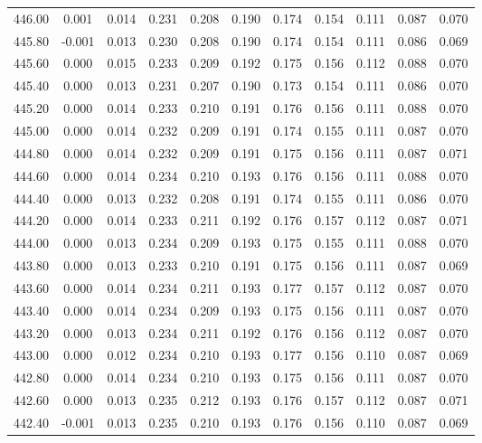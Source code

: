 \begin{longtable}{cccccccccc}
    446.00 &  0.001 &  0.014 &  0.231 &  0.208 &  0.190 &  0.174 &  0.154 &  0.111 &  0.087 &  0.070 \\
    445.80 & -0.001 &  0.013 &  0.230 &  0.208 &  0.190 &  0.174 &  0.154 &  0.111 &  0.086 &  0.069 \\
    445.60 &  0.000 &  0.015 &  0.233 &  0.209 &  0.192 &  0.175 &  0.156 &  0.112 &  0.088 &  0.070 \\
    445.40 &  0.000 &  0.013 &  0.231 &  0.207 &  0.190 &  0.173 &  0.154 &  0.111 &  0.086 &  0.070 \\
    445.20 &  0.000 &  0.014 &  0.233 &  0.210 &  0.191 &  0.176 &  0.156 &  0.111 &  0.088 &  0.070 \\
    445.00 &  0.000 &  0.014 &  0.232 &  0.209 &  0.191 &  0.174 &  0.155 &  0.111 &  0.087 &  0.070 \\
    444.80 &  0.000 &  0.014 &  0.232 &  0.209 &  0.191 &  0.175 &  0.156 &  0.111 &  0.087 &  0.071 \\
    444.60 &  0.000 &  0.014 &  0.234 &  0.210 &  0.193 &  0.176 &  0.156 &  0.111 &  0.088 &  0.070 \\
    444.40 &  0.000 &  0.013 &  0.232 &  0.208 &  0.191 &  0.174 &  0.155 &  0.111 &  0.086 &  0.070 \\
    444.20 &  0.000 &  0.014 &  0.233 &  0.211 &  0.192 &  0.176 &  0.157 &  0.112 &  0.087 &  0.071 \\
    444.00 &  0.000 &  0.013 &  0.234 &  0.209 &  0.193 &  0.175 &  0.155 &  0.111 &  0.088 &  0.070 \\
    443.80 &  0.000 &  0.013 &  0.233 &  0.210 &  0.191 &  0.175 &  0.156 &  0.111 &  0.087 &  0.069 \\
    443.60 &  0.000 &  0.014 &  0.234 &  0.211 &  0.193 &  0.177 &  0.157 &  0.112 &  0.087 &  0.070 \\
    443.40 &  0.000 &  0.014 &  0.234 &  0.209 &  0.193 &  0.175 &  0.156 &  0.111 &  0.087 &  0.070 \\
    443.20 &  0.000 &  0.013 &  0.234 &  0.211 &  0.192 &  0.176 &  0.156 &  0.112 &  0.087 &  0.070 \\
    443.00 &  0.000 &  0.012 &  0.234 &  0.210 &  0.193 &  0.177 &  0.156 &  0.110 &  0.087 &  0.069 \\
    442.80 &  0.000 &  0.014 &  0.234 &  0.210 &  0.193 &  0.175 &  0.156 &  0.111 &  0.087 &  0.070 \\
    442.60 &  0.000 &  0.013 &  0.235 &  0.212 &  0.193 &  0.176 &  0.157 &  0.112 &  0.087 &  0.071 \\
    442.40 & -0.001 &  0.013 &  0.235 &  0.210 &  0.193 &  0.176 &  0.156 &  0.110 &  0.087 &  0.069 \\

\end{longtable}
